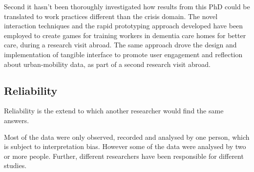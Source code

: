 Second it hasn't been thoroughly investigated how results from this PhD could be translated to work practices different than the crisis domain. The novel interaction techniques and the rapid prototyping approach developed have been employed to create games for training workers in dementia care homes for better care, during a research visit abroad. The same approach drove the design and implementation of tangible interface to promote user engagement and reflection about urban-mobility data, as part of a second research visit abroad.

\subsection{Reliability}\label{reliability}

Reliability is the extend to which another researcher would find the same answers.

Most of the data were only observed, recorded and analysed by one person, which is subject to interpretation bias. However some of the data were analysed by two or more people. Further, different researchers have been responsible for different studies. 
